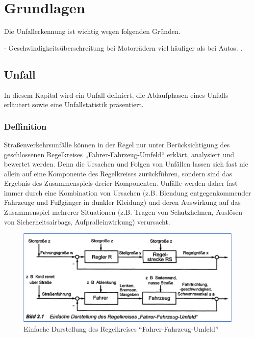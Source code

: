 \chapter{Grundlagen}
Die Unfallerkennung ist wichtig wegen folgenden Gründen.

-	Geschwindigkeitsüberschreitung bei Motorrädern viel häufiger als bei Autos.
.
\\



%
%
\section{Unfall}
In diesem Kapital wird ein Unfall definiert, die Ablaufphasen eines Unfalls erläutert sowie eine Unfallstatistik präsentiert.
%
%
%
%
\subsection{Deffinition}
Straßenverkehrsunfälle können in der Regel nur unter Berücksichtigung des geschlossenen Regelkreises „Fahrer-Fahrzeug-Umfeld“ erklärt, analysiert und bewertet werden. Denn die Ursachen und Folgen von Unfällen lassen sich fast nie allein auf eine Komponente des Regelkreises zurückführen, sondern sind das Ergebnis des Zusammenspiels dreier Komponenten. Unfälle werden daher fast immer durch eine Kombination von Ursachen (z.B. Blendung entgegenkommender Fahrzeuge und Fußgänger in dunkler Kleidung) und deren Auswirkung auf das Zusammenspiel mehrerer Situationen (z.B. Tragen von Schutzhelmen, Auslösen von Sicherheitsairbags, Aufpralleinwirkung) verursacht. \cite{Appel2002}

\begin{figure}[H]
	\centering
	\includegraphics[width=\linewidth]{Bilder/FahrenRegelkreis.png}
	\caption{Einfache Darstellung des Regelkreises \textquotedblleft Fahrer-Fahrzeug-Umfeld\textquotedblright \cite{Appel2002}}
	\label{fig:FahrenRegelkreis}
\end{figure}

